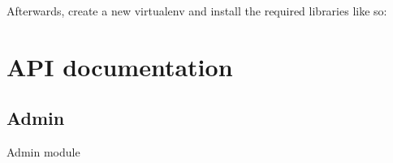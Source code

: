 \documentclass[letterpaper,10pt,openany,oneside,english]{sphinxmanual}
\begin{document}
Afterwards, create a new virtualenv and install the required libraries like so:

%
\begin{sphinxVerbatim}[commandchars=\\\{\}]
   
 
   
\end{sphinxVerbatim}


\chapter{API documentation}
\label{\detokenize{index:api-documentation}}

\section{Admin}
\label{\detokenize{index:module-animals.admin}}\label{\detokenize{index:admin}}
Admin module
\end{document}
